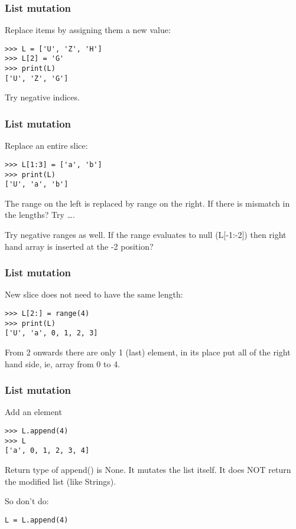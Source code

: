 \begin{frame}[fragile]\frametitle{List mutation}
Replace items by assigning them
  a new value:
\begin{lstlisting}
>>> L = ['U', 'Z', 'H']
>>> L[2] = 'G'
>>> print(L)
['U', 'Z', 'G']
\end{lstlisting}
Try negative indices.
\end{frame}

\begin{frame}[fragile]\frametitle{List mutation}

Replace an entire slice:
\begin{lstlisting}
>>> L[1:3] = ['a', 'b']
>>> print(L)
['U', 'a', 'b']
\end{lstlisting}
The range on the left is replaced by range on the right. If there is mismatch in the lengths? Try \ldots. 

Try negative ranges as well. If the range evaluates to null (L[-1:-2]) then right hand array is inserted at the -2 position?
\end{frame}


\begin{frame}[fragile]\frametitle{List mutation}
New slice does not need to have the same length:
\begin{lstlisting}
>>> L[2:] = range(4)
>>> print(L)
['U', 'a', 0, 1, 2, 3]
\end{lstlisting}
From 2 onwards there are only 1 (last) element, in its place put all of the right hand side, ie, array from 0 to 4.
\end{frame}

\begin{frame}[fragile]\frametitle{List mutation}
Add an element
\begin{lstlisting}
>>> L.append(4)
>>> L
['a', 0, 1, 2, 3, 4]
\end{lstlisting}
Return type of append() is None. It mutates the list itself. It does NOT return the modified list (like Strings).

So don't do:

\begin{lstlisting}
L = L.append(4)
\end{lstlisting}

\end{frame}

